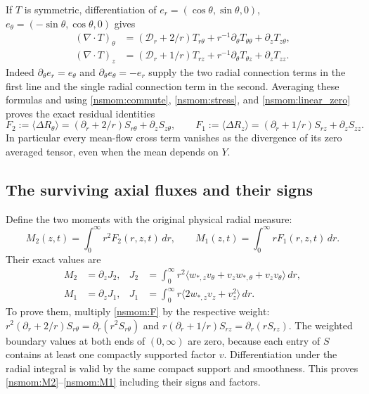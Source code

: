 \documentclass[11pt]{article}
\begin{document}
If $T$ is symmetric, differentiation of
$e_r=(\cos\theta,\sin\theta,0)$,
$e_\theta=(-\sin\theta,\cos\theta,0)$ gives
\begin{align*}
 (\nabla\cdot T)_\theta
   &=(\mathscr D_r+2/r)T_{r\theta}
       +r^{-1}\partial_\theta T_{\theta\theta}+\partial_zT_{z\theta},\\
 (\nabla\cdot T)_z
   &=(\mathscr D_r+1/r)T_{rz}
       +r^{-1}\partial_\theta T_{\theta z}+\partial_zT_{zz}.
\end{align*}
Indeed $\partial_\theta e_r=e_\theta$ and
$\partial_\theta e_\theta=-e_r$ supply the two radial connection
terms in the first line and the single radial connection term in the
second. Averaging these formulas and using
\eqref{nsmom:commute}, \eqref{nsmom:stress}, and \eqref{nsmom:linear_zero}
proves the exact residual identities
\begin{equation}
 F_2:=\langle\Delta R_\theta\rangle
    =(\partial_r+2/r)S_{r\theta}+\partial_zS_{z\theta},
 \qquad
 F_1:=\langle\Delta R_z\rangle
    =(\partial_r+1/r)S_{rz}+\partial_zS_{zz}.
 \label{nsmom:F}
\end{equation}
In particular every mean-flow cross term vanishes as the divergence
of its zero averaged tensor, even when the mean depends on $Y$.

\subsection{The surviving axial fluxes and their signs}
\label{nsmom:moments}
Define the two moments with the original physical radial measure:
\begin{equation}
 M_2(z,t)=\int_0^\infty r^2F_2(r,z,t)\,dr,
 \qquad M_1(z,t)=\int_0^\infty rF_1(r,z,t)\,dr.
 \label{nsmom:Mdef}
\end{equation}
Their exact values are
\begin{align}
 M_2&=\partial_z J_2, &
 J_2&=\int_0^\infty r^2
    \langle w_{*,z}v_\theta+v_z w_{*,\theta}+v_zv_\theta\rangle\,dr,
 \label{nsmom:M2}\\
 M_1&=\partial_z J_1, &
 J_1&=\int_0^\infty r
    \langle2w_{*,z}v_z+v_z^2\rangle\,dr.
 \label{nsmom:M1}
\end{align}
To prove them, multiply \eqref{nsmom:F} by the respective weight:
$r^2(\partial_r+2/r)S_{r\theta}=\partial_r(r^2S_{r\theta})$
and $r(\partial_r+1/r)S_{rz}=\partial_r(rS_{rz})$.
The weighted boundary values at both ends of $(0,\infty)$ are zero,
because each entry of $S$ contains at least one compactly supported
factor $v$. Differentiation under the radial integral is valid by the
same compact support and smoothness. This proves
\eqref{nsmom:M2}--\eqref{nsmom:M1} including their signs and factors.
\end{document}
